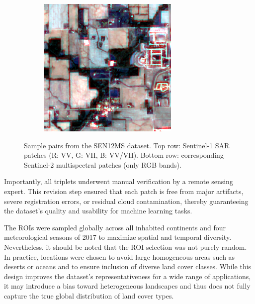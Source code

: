 \begin{figure}[htbp]
\begin{subfigure}{0.18\textwidth}
    \end{subfigure}
    \begin{subfigure}{0.18\textwidth}
        \includegraphics[width=\linewidth]{img/ROIs1970_fall_s2_145_p100.png}
    \end{subfigure}

    \caption{Sample pairs from the SEN12MS dataset. Top row: Sentinel-1 SAR patches (R: VV, G: VH, B: VV/VH). Bottom row: corresponding Sentinel-2 multispectral patches (only RGB bands).}
    \label{fig:sen12ms_pairs}
\end{figure}


Importantly, all triplets underwent manual verification by a remote sensing expert. This revision step ensured that each patch is free from major artifacts, severe registration errors, or residual cloud contamination, thereby guaranteeing the dataset’s quality and usability for machine learning tasks.

The ROIs were sampled globally across all inhabited continents and four meteorological seasons of 2017 to maximize spatial and temporal diversity. Nevertheless, it should be noted that the ROI selection was not purely random. In practice, locations were chosen to avoid large homogeneous areas such as deserts or oceans and to ensure inclusion of diverse land cover classes. While this design improves the dataset’s representativeness for a wide range of applications, it may introduce a bias toward heterogeneous landscapes and thus does not fully capture the true global distribution of land cover types.

